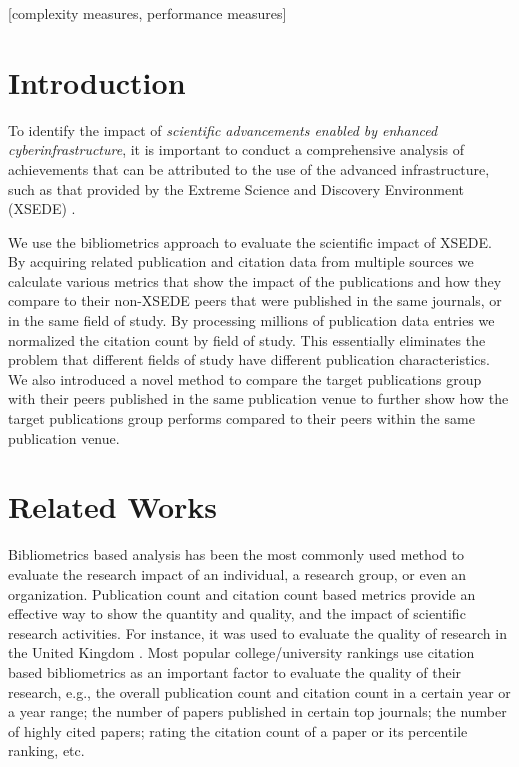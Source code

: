\documentclass{sig-alternate}
\begin{document}
\vspace{-6pt}

[complexity measures,
performance measures]



\section{Introduction} 

To identify the impact of {\em scientific advancements enabled by enhanced
cyberinfrastructure}, it is important to conduct a comprehensive analysis
of achievements that can be attributed to the use of the advanced infrastructure,
such as that provided by the Extreme Science and Discovery Environment (XSEDE) \cite{www-xsede,xsede}.

We use the bibliometrics approach to evaluate the scientific impact of XSEDE. By
acquiring related publication and citation data from multiple sources we calculate various
metrics that show the impact of the publications and how they compare to their non-XSEDE peers that
were published in the same journals, or in the same field of study. By processing millions of
publication data entries we normalized the citation count by field of study. This essentially
eliminates the problem that different fields of study have different publication characteristics. We also introduced a novel method to compare the target publications group with their peers published in the same publication venue to further show how the target publications group performs compared to their peers
within the same publication venue.


\section{Related Works} \label{S:related}

Bibliometrics based analysis has been the most commonly used method to evaluate the
research impact of an individual, a research group, or even an organization. Publication count
and citation count based metrics provide an effective way to show the quantity and quality,
and the impact of scientific research activities. For instance, it was used to evaluate the
quality of research in the United Kingdom \cite{thomas1998institutional, penfield2014assessment}. Most popular
college/university rankings use citation based bibliometrics as an important factor to evaluate
the quality of their research, e.g., the overall publication count and citation count in a certain year
or a year range; the number of papers published in certain top journals; the number of highly cited papers;
rating the citation count of a paper or its percentile ranking, etc.
\end{document}
